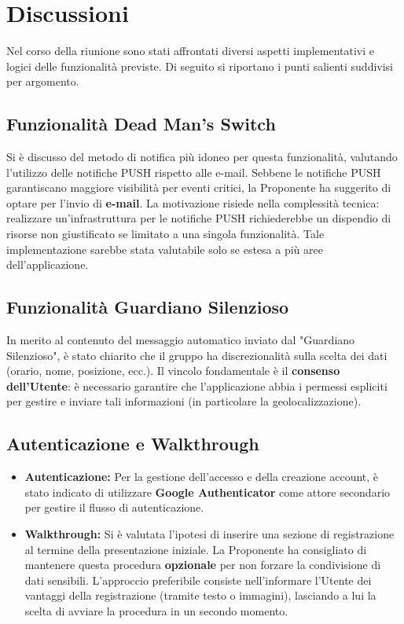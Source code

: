 \documentclass[a4paper,12pt]{article}
\begin{document}
\section{Discussioni}
Nel corso della riunione sono stati affrontati diversi aspetti implementativi e logici delle funzionalità previste. Di seguito si riportano i punti salienti suddivisi per argomento.

\subsection{Funzionalità Dead Man's Switch}
Si è discusso del metodo di notifica più idoneo per questa funzionalità, valutando l'utilizzo delle notifiche PUSH rispetto alle e-mail.
Sebbene le notifiche PUSH garantiscano maggiore visibilità per eventi critici, la Proponente ha suggerito di optare per l'invio di \textbf{e-mail}.
La motivazione risiede nella complessità tecnica: realizzare un'infrastruttura per le notifiche PUSH richiederebbe un dispendio di risorse non giustificato se limitato a una singola funzionalità. Tale implementazione sarebbe stata valutabile solo se estesa a più aree dell'applicazione.

\subsection{Funzionalità Guardiano Silenzioso}
In merito al contenuto del messaggio automatico inviato dal "Guardiano Silenzioso", è stato chiarito che il gruppo ha discrezionalità sulla scelta dei dati (orario, nome, posizione, ecc.).
Il vincolo fondamentale è il \textbf{consenso dell'Utente}: è necessario garantire che l'applicazione abbia i permessi espliciti per gestire e inviare tali informazioni (in particolare la geolocalizzazione).

\subsection{Autenticazione e Walkthrough}
\begin{itemize}
    \item \textbf{Autenticazione:} Per la gestione dell'accesso e della creazione account, è stato indicato di utilizzare \textbf{Google Authenticator} come attore secondario per gestire il flusso di autenticazione.
    \item \textbf{Walkthrough:} Si è valutata l'ipotesi di inserire una sezione di registrazione al termine della presentazione iniziale. La Proponente ha consigliato di mantenere questa procedura \textbf{opzionale} per non forzare la condivisione di dati sensibili. L'approccio preferibile consiste nell'informare l'Utente dei vantaggi della registrazione (tramite testo o immagini), lasciando a lui la scelta di avviare la procedura in un secondo momento.
\end{itemize}
\end{document}
